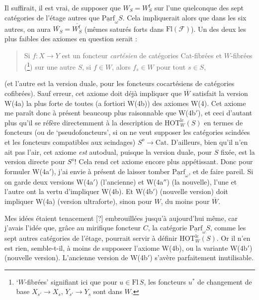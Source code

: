 \documentclass[11pt]{article}
\newcommand{\printedpage}[1]{\marginpar{\footnotesize p.~#1}}
\newcommand{\msp}[1]{\marginpar{\footnotesize [#1]}}
\newcommand{\Parf}{\underline{\mathrm{Parf}}}
\newcommand{\HOT}{\mathrm{HOT}}
\begin{document}
\msp{page 185}
Il suffirait, il est vrai, de supposer que $W_S = W^{\mathrm{f}}_S$ sur l'une quelconque des sept catégories de l'étage autres que $\Parf_\omega S$. Cela impliquerait alors que dans les six autres, on aura $\overline{W_S} = \overline{W^{\mathrm{f}}_S}$ (mêmes saturés forts dans $\mathrm{Fl}(\mathcal{F})$). Un des deux les plus faibles des axiomes en question serait : %

\begin{quote}
Si $f : X \longrightarrow Y$ est un foncteur \textit{cartésien} de catégories Cat-fibrées et $W$-fibrées (\footnote{‘$W$-fibrées’ signifiant ici que pour $u \in \mathrm{Fl}\,S$, les foncteurs $u^*$ de changement de base $X_{s'} \longrightarrow X_s$, $Y_{s'} \longrightarrow Y_s$ sont dans $W$.}) sur une autre $S$, si $f \in W$, alors $f_s \in W$ pour tout $s \in S$,
\end{quote}

(et l'autre est la version duale, pour les foncteurs cocartésiens de catégories cofibrées). Sauf erreur, cet axiome doit déjà impliquer que $\overline{W}$ satisfait la version W(4a) la plus forte
\printedpage{115}
de toutes (a fortiori W(4b)) des axiomes W(4). Cet axiome me paraît donc à présent beaucoup plus raisonnable que W(4b$'$), et ceci d'autant plus qu'il se réfère directemment à la description de $\HOT^{\mathrm{lc}}_W(S)$ en termes de foncteurs (ou de ‘pseudofoncteurs’, si on ne veut supposer les catégories scindées et les foncteurs compatibles aux scindages) $S^{o} \longrightarrow \mathrm{Cat}$. %
D'ailleurs, bien qu'il n'en ait pas l'air, cet axiome \textit{est} autodual, puisque la version duale, pour $S$ fixée, est la version directe pour $S^{o}$! Cela rend cet axiome encore plus appétissant. Donc pour formuler W(4a$'$), j'ai envie à présent de laisser tomber $\Parf_\omega$, et de faire pareil. Si on garde deux versions W(4a$'$) (l'ancienne) et W(4a$''$) (la nouvelle), l'une et l'autre ont la vertu d'impliquer W(4b). Et W(4b$'$) (nouvelle version) doit impliquer W(4a) (version ultraforte), sinon pour $W$, du moins pour $\overline{W}$.

Mes idées étaient tenacement [?] embrouillées
\msp{page 186}
jusqu'à aujourd'hui même, car j'avais l'idée que, grâce au mirifique foncteur $C$, la catégorie $\Parf_\omega S$, comme les sept autres catégories de l'étage, pourrait servir à définir $\HOT^{\mathrm{lc}}_W(S)$. Or il n'en est rien, semble-t-il, à moins de supposeer l'axiome W(4b), ou la variante W(4b$'$) (nouvelle version). L'ancienne version de W(4b$'$) s'avère parfaitement inutilisable. %
\end{document}
